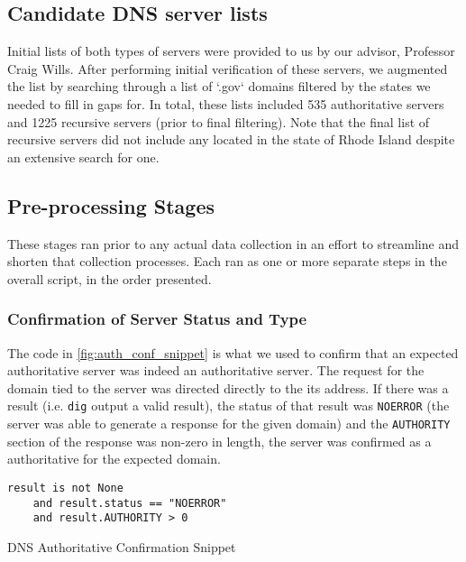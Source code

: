 \subsection{Candidate DNS server lists}

Initial lists of both types of \dns servers were provided to us by our advisor, Professor Craig Wills. After performing initial verification of these servers, we augmented the list by searching through a list of `.gov` domains filtered by the states we needed to fill in gaps for. In total, these lists included 535 authoritative servers and 1225 recursive servers (prior to final filtering). Note that the final list of recursive servers did not include any located in the state of Rhode Island despite an extensive search for one.

\subsection{Pre-processing Stages}

These stages ran prior to any actual data collection in an effort to streamline and shorten that collection processes. Each ran as one or more separate steps in the overall script, in the order presented.

\subsubsection{Confirmation of Server Status and Type}\label{sec:dns_impl_confirmation_of_status_and_type}

The code in \cref{fig:auth_conf_snippet} is what we used to confirm that an expected authoritative server was indeed an authoritative server. The request for the domain tied to the server was directed directly to the its \ip address. If there was a result (i.e. \texttt{dig} output a valid result), the status of that result was \texttt{NOERROR} (the server was able to generate a response for the given domain) and the \texttt{AUTHORITY} section of the response was non-zero in length, the server was confirmed as a authoritative for the expected domain.

\begin{code}[htb]
\centering
\begin{minipage}{0.5\textwidth}
    \begin{verbatim}
result is not None 
    and result.status == "NOERROR" 
    and result.AUTHORITY > 0
    \end{verbatim}
    \end{minipage}
    \caption{DNS Authoritative Confirmation Snippet}
    \label{fig:auth_conf_snippet}
\end{code}

